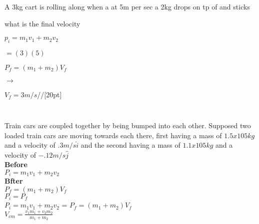 \documentclass{article}
\begin{document}
\subsubsection{}
\hrulefill

A 3kg cart is rolling along when a at 5m per sec a 2kg drops on tp of and sticks

what is the final velocity 

$p_i = m_1v_1 +m_2v_2$

$=(3)(5)$

$P_f = (m_1+ m_2) V_f$

$\rightarrow$

$V_f = 3m/s$//[20pt]


\hrulefill
\subsubsection{}
\hrulefill \\[15pt]

Train cars are coupled together by being bumped into each other. Supposed two loaded train cars are moving towards each there, first having a mass of $1.5 x 105kg$ and a velocity of $.3m/s \hat{i}$ and the second having a mass of $1.1x105kg$ and a velocity of $-.12m/s \hat{j}$\\[20pt]

\textbf{\large Before}\\
$P_i = m_1v_1 +m_2v_2$\\[15pt]

\textbf{\large Bfter}\\
$P_f = (m_1+ m_2) V_f$\\[15pt]

$P_i = P_f$\\[15pt]

$P_i = m_1v_1 +m_2v_2$ = $P_f = (m_1+ m_2) V_f$\\[15pt]

$V_{cm} = \frac{v_1m_1+v_2m_2}{m_1 + m_2 }$\\[15pt]


\hrulefill
\subsubsection{}
\hrulefill \\[15pt]
\end{document}
